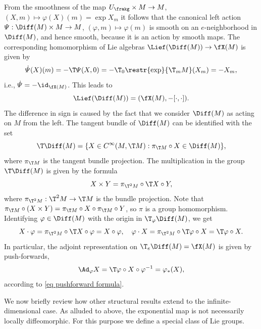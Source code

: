 \begin{example}
    From the smoothness of the map $U_\frakg\times M\to M$, $(X,m)\mapsto \varphi(X)(m)=\exp X_m$ it follows that the canonical left action $\varPsi:\Diff(M)\times M\to M$, $(\varphi,m)\mapsto \varphi(m)$ is smooth on an $e$-neighborhood in $\Diff(M)$, and hence smooth, because it is an action by smooth maps. The corresponding homomorphism of Lie algebras $\Lief(\Diff(M))\to \fX(M)$ is given by
    \[\dot\varPsi(X)(m)=-\T\varPsi (X,0)=-\T_{0}\restr{\exp}{\T_m M}(X_m)=-X_m,\]
    i.e., $\dot\varPsi=-\id_{\fX(M)}$. This leads to
    \[\Lief (\Diff(M))=(\fX(M),-[\cdot,\cdot]).\]
    The difference in sign is caused by the fact that we consider $\Diff(M)$ as acting on $M$ from the left. The tangent bundle of $\Diff(M)$ can be identified with the set
    \[\T\Diff(M)=\{X\in C^\infty(M,\T M):\pi_{\T M}\circ X\in \Diff(M)\},\]
    where $\pi_{\T M}$ is the tangent bundle projection. The multiplication in the group $\T\Diff(M)$ is given by the formula
    \[X\times Y=\pi_{\T^2M}\circ \T X\circ Y,\]
    where $\pi_{\T^2M}:\T^2M\to \T M$ is the bundle projection. Note that $\pi_{\T M}\circ (X\times Y)=\pi_{\T M}\circ X\circ \pi_{\T M}\circ Y$, so $\pi$ is a group homomorphism. Identifying $\varphi\in\Diff(M)$ with the origin in $\T_\varphi\Diff(M)$, we get 
    \[X\cdot \varphi=\pi_{\T^2M}\circ \T X\circ \varphi=X\circ \varphi,\quad \varphi\cdot X=\pi_{\T^2M}\circ \T\varphi\circ X=\T\varphi\circ X.\]
    In particular, the adjoint representation on $\T_e\Diff(M)=\fX(M)$ is given by push-forwards,
    \[\Ad_\varphi X=\T\varphi\circ X\circ \varphi^{-1}=\varphi_\ast (X),\]
    according to \eqref{eq pushforward formula}.
\end{example}


We now briefly review how other structural results extend to the infinite-dimensional case. As alluded to above, the exponential map is not necessarily locally diffeomorphic. For this purpose we define a special class of Lie groups.

